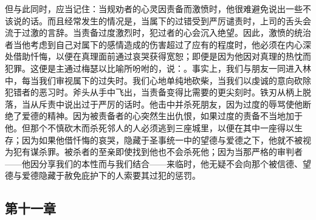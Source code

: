但与此同时，应当记住：当规劝者的心灵因责备而激愤时，他很难避免说出一些不该说的话。而且经常发生的情况是，当属下的过错受到严厉谴责时，上司的舌头会流于过激的言辞。当责备过度激烈时，犯过者的心会沉入绝望。因此，激愤的统治者当他考虑到自己对属下的感情造成的伤害超过了应有的程度时，他必须在内心深处借助忏悔，以便在真理面前通过哀哭获得宽恕；即便是因为他因对真理的热忱而犯罪。这便是主通过梅瑟以比喻所吩咐的，说：。事实上，我们与朋友一同进入林中，每当我们审视属下的过失时。我们心地单纯地砍柴，当我们以虔诚的意向砍除犯错者的恶习时。斧头从手中飞出，当责备变得比需要的更尖刻时。铁刃从柄上脱落，当从斥责中说出过于严厉的话时。他击中并杀死朋友，因为过度的辱骂使他断绝了爱德的精神。因为被责备者的心突然生出仇恨，如果过度的责备不当地加于他。但那个不慎砍木而杀死邻人的人必须逃到三座城里，以便在其中一座得以生存；因为如果他借忏悔的哀哭，隐藏于圣事统一中的望德与爱德之下，他就不被视为犯有谋杀罪。被杀者的至亲即使找到他也不会杀死他；因为当那严格的审判者——他因分享我们的本性而与我们结合——来临时，他无疑不会向那个被信德、望德与爱德隐藏于赦免庇护下的人索要其过犯的惩罚。\par


\subsection{第十一章}

\par

